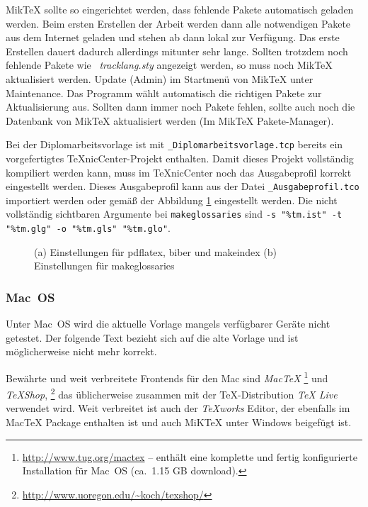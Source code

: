 MikTeX sollte so eingerichtet werden, dass fehlende Pakete automatisch geladen werden. Beim ersten Erstellen der Arbeit werden dann alle notwendigen Pakete aus dem Internet geladen und stehen ab dann lokal zur Verfügung. Das erste Erstellen dauert dadurch allerdings mitunter sehr lange. Sollten trotzdem noch fehlende Pakete wie \zB\ \emph{tracklang.sty} angezeigt werden, so muss noch MikTeX aktualisiert werden. Update (Admin) im Startmenü von MikTeX unter Maintenance. Das Programm wählt automatisch die richtigen Pakete zur Aktualisierung aus. Sollten dann immer noch Pakete fehlen, sollte auch noch die Datenbank von MikTeX aktualisiert werden (Im MikTeX Pakete-Manager).

Bei der Diplomarbeitsvorlage ist mit \texttt{\_Diplomarbeitsvorlage.tcp} bereits ein vorgefertigtes TeXnicCenter-Projekt enthalten. Damit dieses Projekt vollständig kompiliert werden kann, muss im TeXnicCenter noch das Ausgabeprofil korrekt eingestellt werden. Dieses Ausgabeprofil kann aus der Datei \texttt{\_Ausgabeprofil.tco} importiert werden oder gemäß der Abbildung \ref{fig:Settings} eingestellt werden. Die nicht vollständig sichtbaren Argumente bei \texttt{makeglossaries} sind \verb|-s "%tm.ist" -t "%tm.glg" -o "%tm.gls" "%tm.glo"|.

\begin{figure}
    \centering
    \caption
    {
        (a) Einstellungen für pdflatex, biber und makeindex
        (b) Einstellungen für makeglossaries
    }
    \label{fig:Settings}
\end{figure}

\subsubsection{Mac~OS}

Unter Mac~OS wird die aktuelle Vorlage mangels verfügbarer Geräte nicht getestet. Der folgende Text bezieht sich auf die alte Vorlage und ist möglicherweise nicht mehr korrekt.

Bewährte und weit verbreitete Frontends für den Mac sind \emph{MacTeX}%
\footnote{\url{http://www.tug.org/mactex} -- enthält eine komplette und fertig
konfigurierte \latex\-Installation für Mac~OS (ca.\ 1.15 GB download).}
und \emph{TeXShop},%
\footnote{\url{http://www.uoregon.edu/~koch/texshop/}}
das üblicherweise zusammen mit der TeX-Distribution \emph{TeX Live} verwendet wird. 
Weit verbreitet ist auch der \emph{TeXworks} Editor, der ebenfalls im MacTeX Package enthalten ist und auch MiKTeX unter Windows beigefügt ist.

